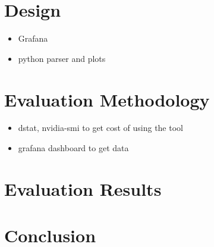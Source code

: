 \documentclass[conference]{IEEEtran}
\begin{document}
\section{Design}

\begin{itemize}
    \item Grafana
    \item python parser and plots
\end{itemize}

\section{Evaluation Methodology}

\begin{itemize}
    \item dstat, nvidia-smi to get cost of using the tool
    \item grafana dashboard to get data 
\end{itemize}

\section{Evaluation Results}

\section{Conclusion}


\end{document}
